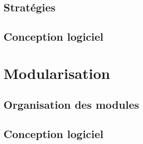 \documentclass[a4paper,12pt]{article}
\begin{document}
\subsection{Stratégies}

\clearpage
\subsection{Conception logiciel}




\section{Modularisation}
\label{sec:module}

\subsection{Organisation des modules}

\clearpage
\subsection{Conception logiciel}


%
\end{document}
